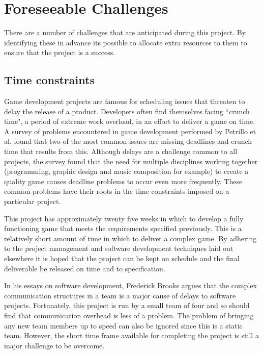 \section{Foreseeable Challenges}
\label{sec:foreseeable_challenges}

There are a number of challenges that are anticipated during this project. By identifying
these in advance its possible to allocate extra resources to them to ensure that the
project is a success.

\subsection{Time constraints}

Game development projects are famous for scheduling issues that threaten to delay the
release of a product. Developers often find themselves facing ``crunch time", a period
of extreme work overload, in an effort to deliver a game on time.\cite[-1em]{groen2011}
A survey of problems encountered in game development performed by Petrillo et al. found
that two of the most common issues are missing deadlines and crunch time that results 
from this.\cite[1em]{petrillo2009} Although delays are a challenge common to all projects,
the survey found that the need for multiple disciplines working together (programming,
graphic design and music composition for example) to create a quality game causes
deadline problems to occur even more frequently. These common problems have their roots
in the time constraints imposed on a particular project.

This project has approximately twenty five weeks in which to develop a fully functioning
game that meets the requirements specified previously. This is a relatively short amount
of time in which to deliver a complex game. By adhering to the project management
and software development techniques laid out elsewhere it is hoped that the project
can be kept on schedule and the final deliverable be released on time and to specification.

In his essays on software development, Frederick Brooks argues that the complex
communication structures in a team is a major cause of delays to software projects.\cite{brooks1995}
Fortunately, this project is run by a small team of four and so should find that
communication overhead is less of a problem. The problem of bringing any new team
members up to speed can also be ignored since this is a static team.
However, the short time frame available for completing the project is still a
major challenge to be overcome.

